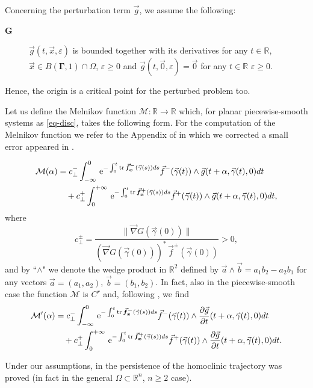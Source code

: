 \documentclass[10pt]{article}
\numberwithin{equation}{section}
\def\eu{ {\, \textrm{\rm e} }}
\def\al{\alpha}
\def\ga{\vec{\gamma}}
\def\ep{\varepsilon}
\def\Om{\Omega}
\def\na{\vec{\nabla}}
\def\R{{\mathbb R}}
\def\x{\vec{x}}
\def\f{\vec{f}}
\def\g{\vec{g}}
\DeclareMathOperator{\tr}{tr}
\newcommand\bs[1]{{\boldsymbol{#1}}}
\newcommand\assump[1]{{\rm\textbf{#1}}}
\theoremstyle{definition}
\theoremstyle{remark}
\begin{document}
Concerning the perturbation term $\g$, we assume the following:
\begin{description}
	\item[\assump{G}]  $\g(t,\x, \ep)$ is bounded together with its derivatives for any $t \in \R$, $\x \in B(\bs{\Gamma}, 1)\cap\Omega$, $\ep \ge 0$ and
$\g(t,\vec{0},\ep)=\vec{0}$ for any $t\in\R$ $\ep \ge 0$.
\end{description}
Hence, the origin is a critical point for the perturbed problem too.

Let us define the Melnikov function $\mathcal{M}:\R\to\R$  which, for planar
 piecewise-smooth systems as \eqref{eq-disc}, takes the following form.
For the computation of the Melnikov function we refer to the Appendix of \cite{CFPrestate} in which
we corrected a small error appeared in \cite{CaFr}.

\begin{equation}\label{melni-disc}
\begin{split}
   \mathcal{M}(\al) &= c^-_{\perp} \int_{-\infty}^{0} \eu^{-\int_0^t
			\tr\boldsymbol{\f_x^-}(\ga(s))ds} \f^-(\ga(t))
		\wedge \g(t+\al,\ga(t),0) dt\\
		&\quad {}+ c^+_{\perp} \int_{0}^{+\infty} \eu^{-\int_0^t
			\tr\boldsymbol{\f_x^+}(\ga(s))ds} \f^+(\ga(t))
		\wedge \g(t+\al,\ga(t),0) dt,
\end{split}
	\end{equation}
where
\[
c_{\perp}^{\pm} =
         \frac{\|\na G(\ga(0))\|}{ (\na G(\ga(0)))^* \, \f^\pm(\ga(0))} >0,
\]
and by ``$\wedge$" we denote the wedge product in $\R^2$ defined by $\vec{a} \wedge \vec{b}= a_1b_2-a_2b_1$
for any vectors $\vec{a}=(a_1,a_2)$, $\vec{b}=(b_1,b_2)$.
In fact, also in the piecewise-smooth case the function $\mathcal{M}$ is $C^r$ and, following \cite{CaFr}, we find
\begin{equation}\label{melni-disc.diff}
\begin{split}
   \mathcal{M}'(\al) &= c^-_{\perp} \int_{-\infty}^{0} \eu^{-\int_0^t
			\tr\boldsymbol{\f_x^-}(\ga(s))ds} \f^-(\ga(t))
		\wedge \frac{\partial\g}{\partial t}(t+\al,\ga(t),0) dt\\
		&\quad {}+ c^+_{\perp} \int_{0}^{+\infty} \eu^{-\int_0^t
			\tr\boldsymbol{\f_x^+}(\ga(s))ds} \f^+(\ga(t))
		\wedge  \frac{\partial\g}{\partial t}(t+\al,\ga(t),0) dt.
\end{split}
	\end{equation}

Under our assumptions, in \cite[Theorem 2.9]{CaFr}    the persistence of the homoclinic trajectory was proved
(in fact in the general $\Om \subset \R^n$, $n \ge 2$ case).
\end{document}
